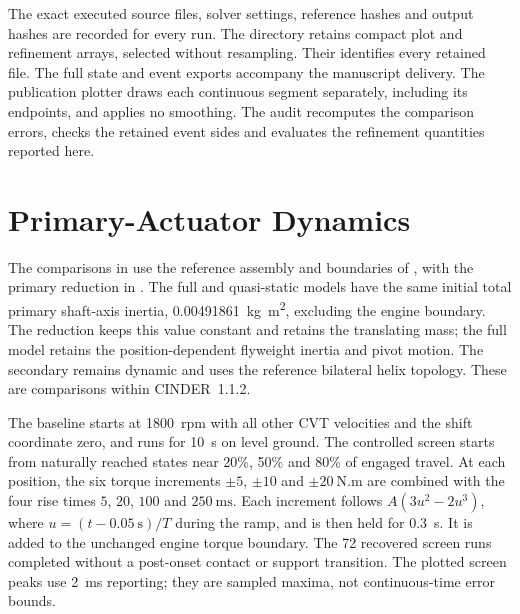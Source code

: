 \documentclass[11pt]{report}
\numberwithin{equation}{section}
\begin{document}
The exact executed source files, solver settings, reference hashes and output
hashes are recorded for every run. The
directory retains compact plot and refinement arrays, selected without
resampling. Their
identifies every retained file.
The full state and event exports accompany the manuscript delivery. The
publication plotter draws each continuous segment separately, including its
endpoints, and applies no smoothing. The audit recomputes the comparison
errors, checks the retained event sides and evaluates the refinement
quantities reported here.

\section{Primary-Actuator Dynamics}
\label{app:study_primary_dynamics}

The comparisons in  use the
reference assembly and boundaries of ,
with the primary reduction in .
The full and quasi-static models have the same initial total primary
shaft-axis inertia, \SI{0.00491861}{kg.m^2}, excluding the engine boundary.
The reduction keeps this value constant and retains the translating mass;
the full model retains the position-dependent flyweight inertia and pivot
motion. The secondary remains dynamic and uses the reference bilateral
helix topology. These are comparisons within CINDER~1.1.2.

The baseline starts at \SI{1800}{rpm} with all other CVT velocities and the
shift coordinate zero, and runs for \SI{10}{s} on level ground. The
controlled screen starts from naturally reached states near 20\%, 50\% and
80\% of engaged travel. At each position, the six torque increments
\(\pm5\), \(\pm10\) and \(\pm20~\mathrm{N.m}\) are combined with the
four rise times \(5\), \(20\), \(100\) and \(250~\mathrm{ms}\).
Each increment follows \(A(3u^2-2u^3)\), where
\(u=(t-0.05~\mathrm{s})/T\) during the ramp, and is then held for
\SI{0.3}{s}. It is added to the unchanged engine torque boundary.
The 72 recovered screen runs completed without a post-onset contact or
support transition. The plotted screen peaks use \SI{2}{ms} reporting;
they are sampled maxima, not continuous-time error bounds.
\end{document}
